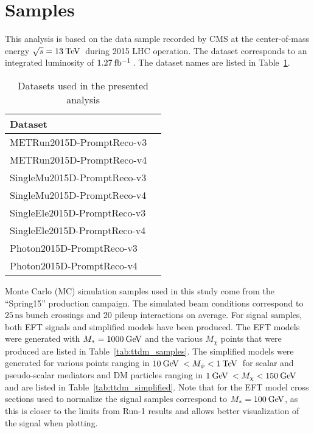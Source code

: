 \section{Samples}
\label{sec:datasets}

This analysis is based on the data sample recorded by CMS at the center-of-mass energy $\sqrt{s}=13\:\mathrm{Te\kern -0.1em V}\:$ during 2015 LHC operation. The dataset corresponds to an integrated luminosity of $1.27\:\mathrm{fb^{-1}}\:$. The dataset names are listed in Table~\ref{tab:data}.

\begin{table}[!ht]
\centering
\begin{tabular}{|l|l|}
\hline
Dataset \\
\hline
METRun2015D-PromptReco-v3 \\
METRun2015D-PromptReco-v4 \\
\hline
SingleMu2015D-PromptReco-v3 \\
SingleMu2015D-PromptReco-v4  \\
\hline
SingleEle2015D-PromptReco-v3 \\
SingleEle2015D-PromptReco-v4 \\
\hline
Photon2015D-PromptReco-v3   \\
Photon2015D-PromptReco-v4   \\
\hline
\end{tabular}
\caption{Datasets used in the presented analysis}
\label{tab:data}
\end{table}

Monte Carlo (MC) simulation samples used in this study come from the ``Spring15'' production campaign. The simulated beam conditions correspond to $25\,\mbox{ns}$ bunch crossings and 20 pileup interactions on average. For signal samples, both EFT signals and simplified models have been produced. The EFT models were generated with $M_*=1000\:\mathrm{Ge\kern -0.1em V}$ and the various $M_\chi$ points that were produced are listed in Table~\ref{tab:ttdm_samples}. The simplified models were generated for various points ranging in $10\:\mathrm{Ge\kern -0.1em V}\:<M_{\phi}<1\:\mathrm{Te\kern -0.1em V}\:$ for scalar and pseudo-scalar mediators and DM particles ranging in $1\:\mathrm{Ge\kern -0.1em V}\:< M_{\chi}<150\:\mathrm{Ge\kern -0.1em V}\:$ and are listed in Table~\ref{tab:ttdm_simplified}. Note that for the EFT model cross sections used to normalize the signal samples correspond to $M_*=100\:\mathrm{Ge\kern -0.1em V}$, as this is closer to the limits from Run-1 results and allows better visualization of the signal when plotting.

